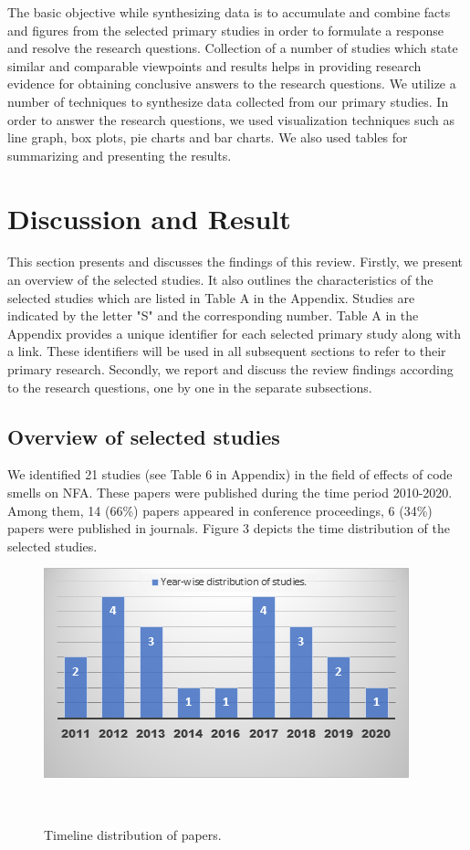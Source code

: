 \documentclass{sigchi}
\begin{document}
The basic objective while synthesizing data is to accumulate and combine facts and figures from the selected primary studies in order to formulate a response and resolve the research questions. Collection of a number of studies which state similar and comparable viewpoints and results helps in providing research evidence for obtaining conclusive answers to the research questions.  We utilize a number of techniques to synthesize data collected from our primary studies. In order to answer the research questions, we used visualization techniques such as line graph, box plots, pie charts and bar charts. We also used tables for summarizing and presenting the results. 

\section{Discussion and Result}
This section presents and discusses the findings of this review. Firstly, we present an overview of the selected studies. It also outlines the characteristics of the selected studies which are listed in Table A in the Appendix. Studies are indicated by the letter "S" and the corresponding number. Table A in the Appendix provides a unique identifier for each selected primary study along with a link. These identifiers will be used in all subsequent sections to refer to their primary research. Secondly, we report and discuss the review findings according to the research questions, one by one in the separate subsections. 

\subsection{Overview of selected studies}

We identified 21 studies (see Table 6 in Appendix) in the field of effects of code smells on NFA. These papers were published during the time period 2010-2020. Among them, 14 (66\%) papers appeared in conference proceedings, 6 (34\%) papers were published in journals. 
Figure 3 depicts the time distribution of the selected studies. 

\begin{figure}[h]
	\centering
	\includegraphics[width=1\columnwidth]{Figures/3}
	\caption{Timeline distribution of papers.}~\label{fig:figure1}
\end{figure}
\end{document}
